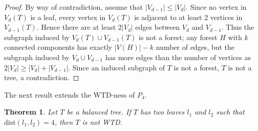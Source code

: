 \documentclass[12pt, reqno]{amsart}
\theoremstyle{definition}
\theoremstyle{plain}
\newtheorem{theorem}{Theorem}[section]
\theoremstyle{definition}
\newcommand{\dist}{\text{dist}}
\begin{document}
\begin{proof}
By way of contradiction, assume that $|V_{d-1}| \leq |V_{d}|$.
Since no vertex in $V_d(T)$ is a leaf, every vertex in $V_d(T)$ is adjacent to at least 2 vertices in $V_{d-1}(T)$. 
Hence there are at least $2|V_d|$ edges between $V_d$ and $V_{d-1}$. 
Thus the subgraph induced by $V_d(T) \cup V_{d-1}(T)$ is not a forest; any forest $H$ with $k$ connected components has exactly $|V(H)| - k$ number of edges, but the subgraph induced by $V_d \cup V_{d-1}$ has more edges than the number of vertices as $2 |V_d| \geq |V_d| + |V_{d-1}|$.
Since an induced subgraph of $T$ is not a forest, $T$ is not a tree, a contradiction.
\end{proof}

The next result extends the WTD-ness of $P_4$.

\begin{theorem}\label{thm. P5 -> Mix}
Let $T$ be a balanced tree. If $T$ has two leaves $l_1$ and $l_2$ such that $\dist(l_1,l_2) = 4$, then $T$ is not WTD. 
\end{theorem}
\end{document}
